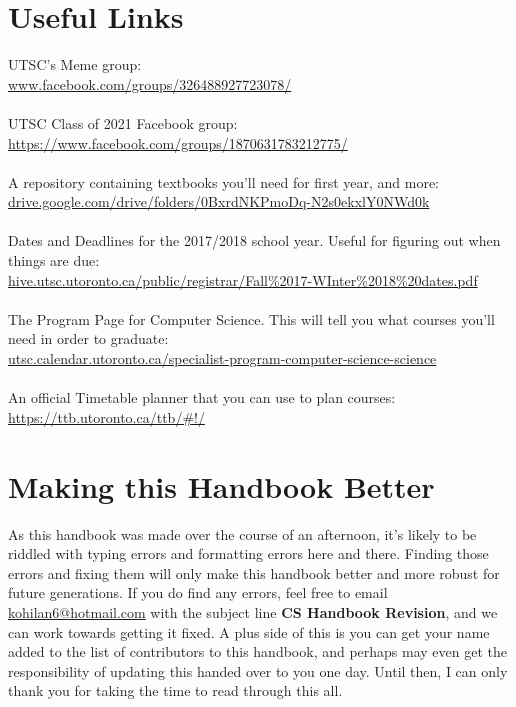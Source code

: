 \documentclass[11pt]{article}
\begin{document}
\section{Useful Links}
UTSC's Meme group:\\ \url{www.facebook.com/groups/326488927723078/}\\\\
UTSC Class of 2021 Facebook group:\\ \url{https://www.facebook.com/groups/1870631783212775/}\\\\
A repository containing textbooks you'll need for first year, and more:\\ \url{drive.google.com/drive/folders/0BxrdNKPmoDq-N2s0ekxlY0NWd0k}\\\\
Dates and Deadlines for the 2017/2018 school year.  Useful for figuring out when things are due:\\ \url{hive.utsc.utoronto.ca/public/registrar/Fall%2017-WInter%2018%20dates.pdf}\\\\
The Program Page for Computer Science.  This will tell you what courses you'll need in order to graduate:\\ \url{utsc.calendar.utoronto.ca/specialist-program-computer-science-science}\\\\
An official Timetable planner that you can use to plan courses:\\
\url{https://ttb.utoronto.ca/ttb/#!/}

\section{Making this Handbook Better}
As this handbook was made over the course of an afternoon, it's likely to be riddled with typing errors and formatting errors here and there.  Finding those errors and fixing them will only make this handbook better and more robust for future generations.  If you do find any errors, feel free to email \href{ mailto:kohilan6@hotmail.com}{kohilan6@hotmail.com} with the subject line \textbf{CS Handbook Revision}, and we can work towards getting it fixed.  A plus side of this is you can get your name added to the list of contributors to this handbook, and perhaps may even get the responsibility of updating this handed over to you one day.  Until then, I can only thank you for taking the time to read through this all.
\end{document}
